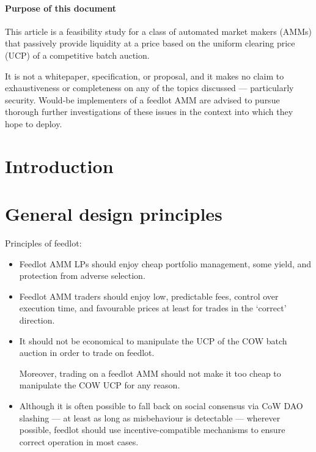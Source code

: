 \documentclass[a4paper,10pt]{article}
\begin{document}
\maketitle
\printsplash

\paragraph{Purpose of this document}

This article is a feasibility study for a class of automated market makers (AMMs) that passively provide liquidity at a price based on the uniform clearing price (UCP) of a competitive batch auction.

It is not a whitepaper, specification, or proposal, and it makes no claim to exhaustiveness or completeness on any of the topics discussed --- particularly security. 
%
Would-be implementers of a feedlot AMM are advised to pursue thorough further investigations of these issues in the context into which they hope to deploy.

\newpage
\section{Introduction}

\section{General design principles}

Principles of feedlot:
\begin{itemize}
  \item
    Feedlot AMM LPs should enjoy cheap portfolio management, some yield, and protection from adverse selection.
    
  \item
    Feedlot AMM traders should enjoy low, predictable fees, control over execution time, and favourable prices at least for trades in the `correct' direction.
    
  \item
    It should not be economical to manipulate the UCP of the COW batch auction in order to trade on feedlot.
    
    Moreover, trading on a feedlot AMM should not make it too cheap to manipulate the COW UCP for any reason.

  \item 
    Although it is often possible to fall back on social consensus via CoW DAO slashing --- at least as long as misbehaviour is detectable --- wherever possible, feedlot should use incentive-compatible mechanisms to ensure correct operation in most cases.
    
  
\end{itemize}
\end{document}
